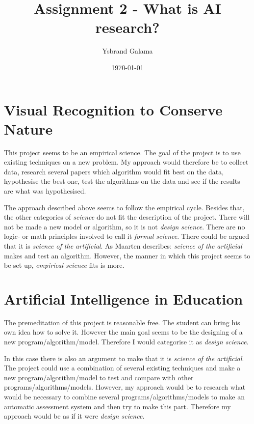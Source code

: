 \documentclass[a4paper,11pt]{article}
\title{Assignment 2 - What is AI research?}
\author{Ysbrand Galama}
\date{\today}
\begin{document}
\maketitle

\section*{Visual Recognition to Conserve Nature}
This project seems to be an empirical science. The goal of the project is to use existing techniques on a new problem. My approach would therefore be to collect data, research several papers which algorithm would fit best on the data, hypothesise the best one, test the algorithms on the data and see if the results are what was hypothesised.

The approach described above seems to follow the empirical cycle. Besides that, the other categories of {\it science} do not fit the description of the project. There will not be made a new model or algorithm, so it is not {\it design science}. There are no logic- or math principles involved to call it {\it formal science}. There could be argued that it is {\it science of the artificial}. As Maarten describes: {\it science of the artificial} makes and test an algorithm. However, the manner in which this project seems to be set up, {\it empirical science} fits is more.

\section*{Artificial Intelligence in Education}
The premeditation of this project is reasonable free. The student can bring his own idea how to solve it. However the main goal seems to be the designing of a new program/algorithm/model. Therefore I would categorise it as {\it design science}.

In this case there is also an argument to make that it is {\it science of the artificial}. The project could use a combination of several existing techniques and make a new program/algorithm/model to test and compare with other programs/algorithms/models. However, my approach would be to research what would be necessary to combine several programs/algorithms/models to make an automatic assessment system and then try to make this part. Therefore my approach would be as if it were {\it design science}.
\end{document}
